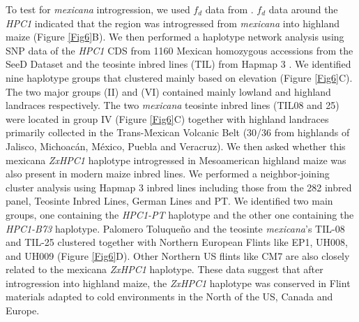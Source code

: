 \documentclass[9pt,twocolumn,twoside,lineno]{BioRxiv}
\begin{document}
To test for \textit{mexicana} introgression, we used \(f_d\) data from \cite{Gonzalez-Segovia2019-jy}.
\(f_d\) data around the \textit{HPC1} indicated that the region was introgressed from \textit{mexicana} into highland maize (Figure \ref{Fig6}B).
We then performed a haplotype network analysis using SNP data of the \textit{HPC1} CDS from 1160 Mexican homozygous accessions from the SeeD Dataset \cite{Romero_Navarro2017-cn} and the teosinte inbred lines (TIL) from Hapmap 3 \cite{Bukowski2017-ng}.   
We identified nine haplotype groups that clustered mainly based on elevation (Figure \ref{Fig6}C). 
The two major groups (II) and (VI) contained mainly lowland and highland landraces respectively. 
The two \textit{mexicana} teosinte inbred lines (TIL08 and 25) were located in group IV  (Figure \ref{Fig6}C) together with highland landraces primarily collected in the Trans-Mexican Volcanic Belt (30/36 from highlands of Jalisco, Michoacán, México, Puebla and Veracruz).
We then asked whether this mexicana \textit{ZxHPC1} haplotype introgressed in Mesoamerican highland maize was also present in modern maize inbred lines. 
We performed a neighbor-joining cluster analysis using Hapmap 3 inbred lines including those from the 282 inbred panel, Teosinte Inbred Lines, German Lines and PT. 
We identified two main groups, one containing the \textit{HPC1-PT} haplotype and the other one containing the \textit{HPC1-B73} haplotype.
Palomero Toluqueño and the teosinte \textit{mexicana}'s TIL-08 and TIL-25 clustered together with Northern European Flints like EP1, UH008, and UH009 (Figure \ref{Fig6}D). 
Other Northern US flints like CM7 are also closely related to the mexicana \textit{ZxHPC1} haplotype. 
These data suggest that after introgression into highland maize, the \textit{ZxHPC1} haplotype was conserved in Flint materials adapted to cold environments in the North of the US, Canada and Europe. 
\end{document}
